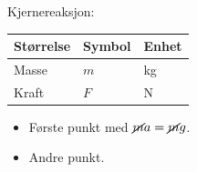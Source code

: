 Kjernereaksjon: 

\begin{tabular}{@{}lll@{}}
\toprule
Størrelse & Symbol & Enhet \\
\midrule
Masse & $m$ & \unit{\kilo\gram} \\
Kraft & $F$ & \unit{\newton} \\
\bottomrule
\end{tabular}

\begin{itemize}
  \item Første punkt med $\cancel{m}a = \cancel{m}g$.
  \item Andre punkt.
\end{itemize}


